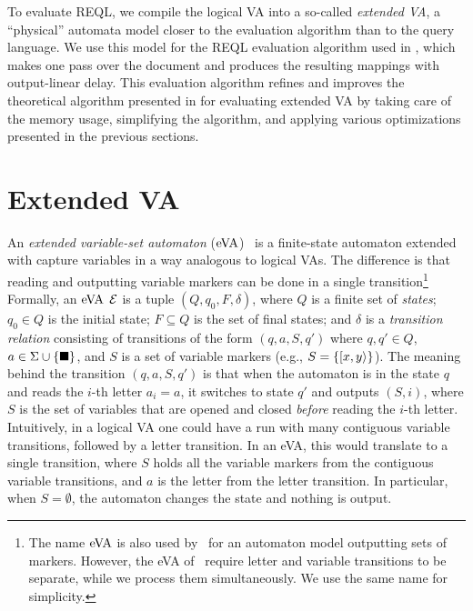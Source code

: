
To evaluate REQL, we compile the logical VA into a so-called \emph{extended VA},
a ``physical'' automata model closer to the evaluation algorithm than to the
query language. We use this model for the REQL evaluation algorithm used in
\rematch, which makes one pass over the document and produces the resulting
mappings with output-linear delay. This evaluation algorithm refines and
improves the theoretical algorithm presented in \citet{FlorenzanoRUVV20} for
evaluating extended VA by taking care of the memory usage, simplifying the
algorithm, and applying various optimizations presented in the previous
sections.    

\section{Extended VA}

An \emph{extended variable-set automaton} (\(\mathrm{eVA}\))~\citep{FaginKRV15} is a
finite-state automaton extended with capture variables in a way analogous to
logical VAs. The difference is that reading and outputting variable markers can
be done in a single transition\footnote{The name $\mathrm{eVA}$ is also used
by~\citet{FlorenzanoRUVV20} for an automaton model outputting sets of markers.
However, the eVA of~\citet{FlorenzanoRUVV20} require letter and variable
transitions to be separate, while we process them simultaneously. We use the
same name for simplicity.}  
Formally, an $\mathrm{eVA}$ $\mathcal{E}$ is a tuple \((Q, q_0, F, \delta)\), where \(Q\) is a
finite set of \textit{states}; $q_0 \in Q$ is the initial state; $F\subseteq Q$
is the set of final states; and $\delta$ is a \textit{transition relation}
consisting of transitions of the form $(q, a, S, q')$ where $q, q' \in Q$, $a
\in \Sigma \cup \{\blacksquare\}$, and $S$ is a set of variable markers (e.g.,
$S=\{[ x,y \rangle\}$). The meaning behind the transition $(q, a, S, q')$
is that when the automaton is in the state $q$ and reads the $i$-th letter $a_i
= a$, it switches to state $q'$ and outputs $(S, i)$, where $S$ is the set of
variables that are opened and closed \emph{before} reading the $i$-th letter.
Intuitively, in a logical VA one could have a run with many contiguous variable
transitions, followed by a letter transition. In an eVA, this would translate to
a single transition, where $S$ holds all the variable markers from the
contiguous variable transitions, and $a$ is the letter from the letter
transition. In particular, when $S = \emptyset$, the automaton changes the state
and nothing is output.

